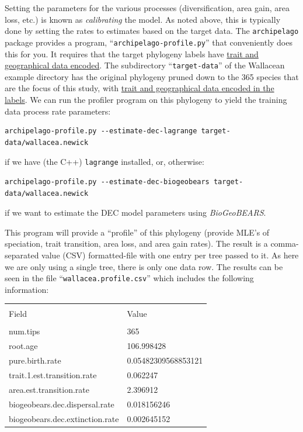 \documentclass[11pt,openany]{memoir} %
\newcommand{\archipelagoPackage}{\texttt{archipelago}\xspace}
\begin{document}
Setting the parameters for the various processes (diversification, area gain, area loss, etc.) is known as \textit{calibrating} the model.
As noted above, this is typically done by setting the rates to estimates based on the target data.
The \archipelagoPackage package provides a program, ``\texttt{archipelago-profile.py}'' that conveniently does this for you.
It requires that the target phylogeny labels have \hyperref[sec:workflow-encoding-the-target-data]{trait and geographical data encoded}.
The subdirectory ``\texttt{target-data}'' of the Wallacean example directory has the original phylogeny pruned down to the 365 species that are the focus of this study, with \hyperref[sec:workflow-encoding-the-target-data]{trait and geographical data encoded in the labels}.
We can run the profiler program on this phylogeny to yield the training data process rate parameters:
\begin{lstlisting}
archipelago-profile.py --estimate-dec-lagrange target-data/wallacea.newick
\end{lstlisting}
if we have (the C++) \texttt{lagrange} installed, or, otherwise:
\begin{lstlisting}
archipelago-profile.py --estimate-dec-biogeobears target-data/wallacea.newick
\end{lstlisting}
if we want to estimate the DEC model parameters using \textit{BioGeoBEARS}.

This program will provide a ``profile'' of this phylogeny (provide MLE's of speciation, trait transition, area loss, and area gain rates).
The result is a comma-separated value (CSV) formatted-file with one entry per tree passed to it.
As here we are only using a single tree, there is only one data row.
The results can be seen in the file ``\texttt{wallacea.profile.csv}'' which includes the following information:


\begin{table}[htp]
\label{tbl:exampleProfile}
\begin{center}
\footnotesize
\begin{tabulary}{\linewidth}{ L L }
\hline \\ [-1.5ex] %
Field   &   Value \\
\hline \\ [-1.5ex] %
num.tips                        & 365 \\
root.age                        & 106.998428 \\
pure.birth.rate                 & 0.05482309568853121 \\
trait.1.est.transition.rate     & 0.062247 \\
area.est.transition.rate        & 2.396912 \\
biogeobears.dec.dispersal.rate  & 0.018156246 \\
biogeobears.dec.extinction.rate & 0.002645152 \\
\hline
\end{tabulary}
\end{center}
\end{table}%
\end{document}
